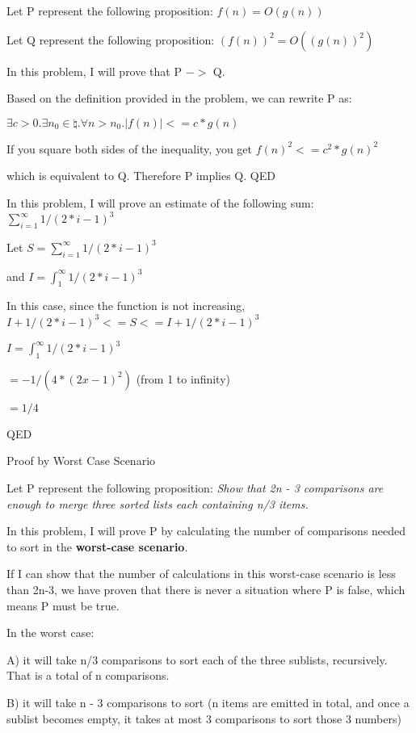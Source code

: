 \documentclass{6042}
\begin{document}
Let P represent the following proposition: $f(n) = O(g(n))$

Let Q represent the following proposition: $(f(n))^2 = O((g(n))^2)$

In this problem, I will prove that P $->$ Q.

Based on the definition provided in the problem, we can rewrite P as:

$\exists{c} > 0. \exists{n_0} \in\natural.\forall{n} > n_0. |f(n)| <= c * g(n)$

If you square both sides of the inequality, you get $f(n)^2 <= c^2 * g(n)^2$

which is equivalent to Q. Therefore P implies Q. QED





In this problem, I will prove an estimate of the following sum: $\sum_{i=1}^\infty 1 / (2*i - 1)^3$

Let $S = \sum_{i=1}^\infty 1 / (2*i - 1)^3$

and $I = \int_1^\infty 1 / (2*i - 1)^3$

In this case, since the function is not increasing, $I + 1 / (2*i - 1)^3 <= S <= I + 1 / (2*i - 1)^3$

$I = \int_1^\infty 1 / (2*i - 1)^3$

$= -1 / (4*(2x-1)^2)$ (from 1 to infinity)

$= 1/4$

QED




Proof by Worst Case Scenario

Let P represent the following proposition: \textit{Show that 2n - 3 comparisons are enough to merge three sorted lists each containing n/3 items.}

In this problem, I will prove P by calculating the number of comparisons needed to sort in the \textbf{worst-case scenario}.

If I can show that the number of calculations in this worst-case scenario is less than 2n-3, we have proven that there is never a situation where P is false, which means P must be true.

In the worst case:

A) it will take n/3 comparisons to sort each of the three sublists, recursively. That is a total of n comparisons.

B) it will take n - 3 comparisons to sort (n items are emitted in total, and once a sublist becomes empty, it takes at most 3 comparisons to sort those 3 numbers)
\end{document}
